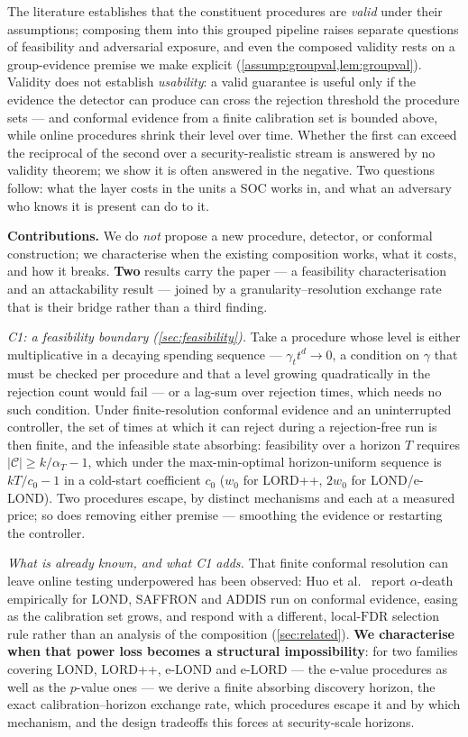 \documentclass[conference]{IEEEtran}
\newcommand{\Cal}{\mathcal{C}}
\newcommand{\nCal}{\lvert\Cal\rvert}
\newcommand{\FDR}{\mathrm{FDR}}
\begin{document}
The literature establishes that the constituent procedures are \emph{valid} under their assumptions;
composing them into this grouped pipeline raises separate questions of feasibility and adversarial
exposure, and even the composed validity rests on a group-evidence premise we make explicit
(\cref{assump:groupval,lem:groupval}). Validity does not establish \emph{usability}: a valid
guarantee is useful only if the evidence the detector can produce can cross
the rejection threshold the procedure sets --- and conformal evidence from a finite calibration set
is bounded above, while online procedures shrink their level over time. Whether the first
can exceed the reciprocal of the second over a security-realistic stream is answered by no
validity theorem; we show it is often answered in the negative. Two questions follow: what the
layer costs in the units a SOC works in, and what an adversary who knows it is present can do to it.

\textbf{Contributions.} We do \emph{not} propose a new procedure, detector, or conformal
construction; we characterise when the existing composition works, what it costs, and how it breaks.
\textbf{Two} results carry the paper --- a feasibility characterisation and an attackability result
--- joined by a granularity--resolution exchange rate that is their bridge rather than a third
finding.

\emph{C1: a feasibility boundary (\cref{sec:feasibility}).} Take a procedure whose level is either
multiplicative in a decaying spending sequence --- $\gamma_t t^d \to 0$, a condition on $\gamma$ that
must be checked per procedure and that a level growing quadratically in the rejection count would
fail --- or a lag-sum over rejection times, which needs no such condition. Under finite-resolution
conformal evidence and an uninterrupted controller, the set of times at which it can reject during a
rejection-free run is then finite, and the infeasible state absorbing: feasibility over a horizon $T$
requires $\nCal \ge k/\alpha_T-1$, which under the max-min-optimal horizon-uniform sequence is
$kT/c_0-1$ in a cold-start coefficient $c_0$ ($w_0$ for LORD++, $2w_0$ for LOND/e-LOND). Two
procedures escape, by distinct mechanisms and each at a measured price; so
does removing either premise --- smoothing the evidence or restarting the controller.

\emph{What is already known, and what C1 adds.} That finite conformal resolution can leave online
testing underpowered has been observed: Huo et al.~\cite{huo2024realtime} report $\alpha$-death
empirically for LOND, SAFFRON and ADDIS run on conformal evidence, easing as the calibration set
grows, and respond with a different, local-$\FDR$ selection rule rather than an analysis of the
composition (\cref{sec:related}). \textbf{We characterise when that power loss becomes a structural
impossibility}: for two families covering LOND, LORD++, e-LOND and e-LORD --- the e-value procedures
as well as the $p$-value ones --- we derive a finite absorbing discovery horizon, the exact
calibration--horizon exchange rate, which procedures escape it and by which mechanism, and the design
tradeoffs this forces at security-scale horizons.
\end{document}
